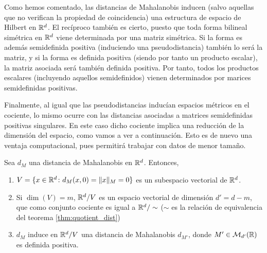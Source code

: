\documentclass{book}
\begin{document}
Como hemos comentado, las distancias de Mahalanobis inducen (salvo aquellas que no verifican la propiedad de coincidencia) una estructura de espacio de Hilbert en $\mathbb{R}^d$. El recíproco también es cierto, puesto que toda forma bilineal simétrica en $\mathbb{R}^d$ viene determinada por una matriz simétrica. Si la forma es además semidefinida positiva (induciendo una pseudodistancia) también lo será la matriz, y si la forma es definida positiva (siendo por tanto un producto escalar), la matriz asociada será también definida positiva. Por tanto, todos los productos escalares (incluyendo aquellos semidefinidos) vienen determinados por marices semidefinidas positivas.

Finalmente, al igual que las pseudodistancias inducían espacios métricos en el cociente, lo mismo ocurre con las distancias asociadas a matrices semidefinidas positivas singulares. En este caso dicho cociente implica una reducción de la dimensión del espacio, como vamos a ver a continuación. Esto es de nuevo una ventaja computacional, pues permitirá trabajar con datos de menor tamaño.

\begin{prop} \label{prop:mahalanobis_lowrank}
	Sea $d_M$ una distancia de Mahalanobis en $\mathbb{R}^d$. Entonces,
	\begin{enumerate}
		\item $V = \{x \in \mathbb{R}^d \colon d_M(x,0) = \|x\|_M = 0 \}$ es un subespacio vectorial de $\mathbb{R}^d$.
		\item Si $\dim(V) = m$, $\mathbb{R}^d / V$ es un espacio vectorial de dimensión $d' = d - m$, que como conjunto cociente es igual a $\mathbb{R}^d/\sim$ ($\sim$ es la relación de equivalencia del teorema \ref{thm:quotient_dist})
		\item $d_M$ induce en $\mathbb{R}^d / V$ una distancia de Mahalanobis $d_{M'}$, donde $M' \in \mathcal{M}_{d'}(\mathbb{R})$ es definida positiva.
	\end{enumerate}
\end{prop}
\end{document}
